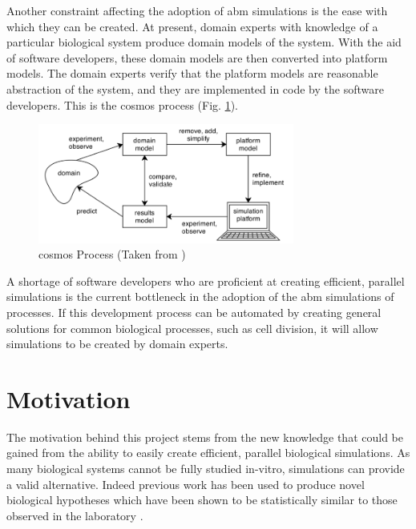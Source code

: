 \documentclass{UoYCSproject}
\begin{document}
Another constraint affecting the adoption of \gls{abm} simulations is the ease with which they can be created.
At present, domain experts with knowledge of a particular biological system produce domain models of the system.
With the aid of software developers, these domain models are then converted into platform models.
The domain experts verify that the platform models are reasonable abstraction of the system, and they are implemented in code by the software developers.
This is the \gls{cosmos} process (Fig. \ref{fig:cosmos_process}).
\label{cosmos_intro}

\begin{figure}[htp]
\centering
\includegraphics[width=0.75\textwidth]{Appendix/CoSMoS_Process}
\caption{\gls{cosmos} Process (Taken from \cite{mark_read_thesis})}
\label{fig:cosmos_process}
\end{figure}

A shortage of software developers who are proficient at creating efficient, parallel simulations is the current bottleneck in the adoption of the \gls{abm} simulations of processes.
If this development process can be automated by creating general solutions for common biological processes, such as cell division, it will allow simulations to be created by domain experts.


\section{Motivation}
The motivation behind this project stems from the new knowledge that could be gained from the ability to easily create efficient, parallel biological simulations.
As many biological systems cannot be fully studied \gls{in-vitro}, simulations can provide a valid alternative.
Indeed previous work has been used to produce novel biological hypotheses which have been shown to be statistically similar to those observed in the laboratory \cite[p.174]{kieran_thesis}.
\end{document}
